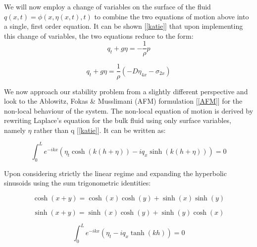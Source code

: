 \documentclass{article}
\begin{document}
\vspace{10} 

We will now employ a change of variables on the surface of the fluid \(q(x,t) = \phi(x,\eta(x,t),t) \) to combine the two equations of motion above into a single, first order equation. It can be shown [\ref{katie}] that upon implementing this change of variables, the two equations reduce to the form:\\

\begin{equation} \label{no}
q_{t} + g\eta = -\frac{1}{\rho}p
\end{equation}


\begin{equation} \label{local}
q_{t} + g\eta = \frac{1}{\rho}( -D\eta_{4x} - \sigma_{2x} )
\end{equation}

\vspace{10}

We now approach our stability problem from a slightly different perspective and look to the Ablowitz, Fokas & Musslimani (AFM) formulation [\ref{AFM}] for the non-local behaviour of the system. The non-local equation of motion is derived by rewriting Laplace's equation for the bulk fluid using only surface variables, namely \(\eta\) rather than q [\ref{katie}]. It can be written as:


\begin{equation} \label{no}
\int_{0}^{L} e^{-ikx}(\eta_{t}\cosh(k(h+\eta)) - iq_{x}\sinh(k(h+\eta))) = 0
\end{equation}

Upon considering strictly the linear regime and expanding the hyperbolic sinusoids using the sum trigonometric identities:

\begin{equation} \label{no} 
\cosh(x+y) = \cosh(x)\cosh(y) + \sinh(x)\sinh(y) 
\end{equation}

\begin{equation} \label{no}
\sinh(x+y) = \sinh(x)\cosh(y) + \sinh(y)\cosh(x) 
\end{equation}


\begin{equation} \label{non-local}
\int_{0}^{L} e^{-ikx}(\eta_{t} - iq_{x}\tanh(kh)) = 0
\end{equation}
\end{document}
